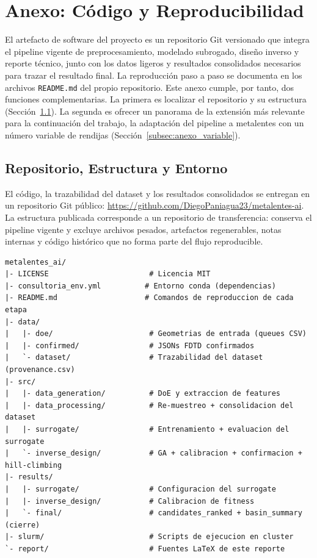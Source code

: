 \section{Anexo: Código y Reproducibilidad}\label{sec:anexo_codigo}

El artefacto de software del proyecto es un repositorio Git versionado que integra el pipeline vigente de preprocesamiento, modelado subrogado, diseño inverso y reporte técnico, junto con los datos ligeros y resultados consolidados necesarios para trazar el resultado final. La reproducción paso a paso se documenta en los archivos \texttt{README.md} del propio repositorio. Este anexo cumple, por tanto, dos funciones complementarias. La primera es localizar el repositorio y su estructura (Sección~\ref{subsec:anexo_repo}). La segunda es ofrecer un panorama de la extensión más relevante para la continuación del trabajo, la adaptación del pipeline a metalentes con un número variable de rendijas (Sección~\ref{subsec:anexo_variable}).

\subsection{Repositorio, Estructura y Entorno}\label{subsec:anexo_repo}

El código, la trazabilidad del dataset y los resultados consolidados se entregan en un repositorio Git público: \url{https://github.com/DiegoPaniagua23/metalentes-ai}. La estructura publicada corresponde a un repositorio de transferencia: conserva el pipeline vigente y excluye archivos pesados, artefactos regenerables, notas internas y código histórico que no forma parte del flujo reproducible.

\begin{lstlisting}[numbers=none, basicstyle=\ttfamily\scriptsize]
metalentes_ai/
|- LICENSE                       # Licencia MIT
|- consultoria_env.yml          # Entorno conda (dependencias)
|- README.md                    # Comandos de reproduccion de cada etapa
|- data/
|   |- doe/                      # Geometrias de entrada (queues CSV)
|   |- confirmed/                # JSONs FDTD confirmados
|   `- dataset/                  # Trazabilidad del dataset (provenance.csv)
|- src/
|   |- data_generation/          # DoE y extraccion de features
|   |- data_processing/          # Re-muestreo + consolidacion del dataset
|   |- surrogate/                # Entrenamiento + evaluacion del surrogate
|   `- inverse_design/           # GA + calibracion + confirmacion + hill-climbing
|- results/
|   |- surrogate/                # Configuracion del surrogate
|   |- inverse_design/           # Calibracion de fitness
|   `- final/                    # candidates_ranked + basin_summary (cierre)
|- slurm/                        # Scripts de ejecucion en cluster
`- report/                       # Fuentes LaTeX de este reporte
\end{lstlisting}

